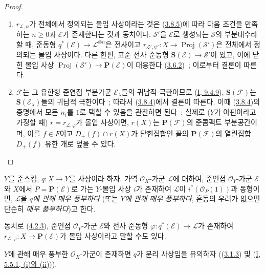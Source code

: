 \begin{proof}
\begin{enumerate}
  \item[\rm{(i)}] $r_{\mathcal{L},\psi}$가 전체에서 정의되는 몰입
  사상이라는 것은
  (\hyperref[II.3.8.5-ko]{3.8.5})에 따라 다음 조건을 만족하는
  $n\geq0$과 $\mathcal{E}$가 존재한다는 것과 동치이다.
  $\mathcal{S}'$을 $\mathcal{E}$로 생성되는 $\mathcal{S}$의
  부분대수라 할 때, 준동형
  $q^*(\mathcal{E})\to\mathcal{L}^{\otimes n}$은 전사이고
  $r_{\mathcal{L}',\psi'}:X\to\operatorname{Proj}(\mathcal{S}')$은
  전체에서 정의되는 몰입 사상이다. 다른 한편, 표준 전사 준동형
  $\mathbf{S}(\mathcal{E})\to\mathcal{S}'$이 있고, 이에 닫힌 몰입 사상
  $\operatorname{Proj}(\mathcal{S}')\to\mathbf{P}(\mathcal{E})$이
  대응한다 (\hyperref[II.3.6.2-ko]{3.6.2})~; 이로부터 결론이 따른다.
  \item[\rm{(ii)}] $\mathcal{F}$는 그 유한형 준연접 부분가군
  $\mathcal{E}_\lambda$들의 귀납적 극한이므로
  (\hyperref[I.9.4.9-ko]{I, 9.4.9}), $\mathbf{S}(\mathcal{F})$는
  $\mathbf{S}(\mathcal{E}_\lambda)$들의 귀납적 극한이다~; 따라서
  (\hyperref[II.3.8.4-ko]{3.8.4})에서 결론이 따른다. 이때
  (\hyperref[II.3.8.4-ko]{3.8.4})의 증명에서 모든 $n_i$를 $1$로
  택할 수 있음을 관찰하면 된다~: 실제로 ($Y$가 아핀이라고 가정할 때)
  $r=r_{\mathcal{L},\varphi}$가 몰입 사상이면, $r(X)$는
  $\mathbf{P}(\mathcal{F})$의 준콤팩트 부분공간이며, 이를
  $f\in F$이고 $D_+(f)\cap r(X)$가 닫힌집합인 꼴의
  $\mathbf{P}(\mathcal{F})$의 열린집합 $D_+(f)$ 유한 개로 덮을 수 있다.
\end{enumerate}
\end{proof}

\begin{definition}[4.4.2]
\label{II.4.4.2-ko}
$Y$를 준스킴, $q:X\to Y$를 사상이라 하자. 가역
$\mathcal{O}_X$-가군 $\mathcal{L}$에 대하여, 준연접
$\mathcal{O}_Y$-가군 $\mathcal{E}$와 $X$에서
$P=\mathbf{P}(\mathcal{E})$로 가는 $Y$-몰입 사상 $i$가 존재하여
$\mathcal{L}$이 $i^*(\mathcal{O}_P(1))$과 동형이면,
$\mathcal{L}$을 \emph{$q$에 관해 매우 풍부하다} (또는
\emph{$Y$에 관해 매우 풍부하다}, 혼동의 우려가 없으면 단순히
\emph{매우 풍부하다})고 한다.
\end{definition}

동치로 (\hyperref[II.4.2.3-ko]{4.2.3}), 준연접
$\mathcal{O}_Y$-가군 $\mathcal{E}$와 전사 준동형
$\varphi:q^*(\mathcal{E})\to\mathcal{L}$가 존재하여
$r_{\mathcal{L},\varphi}:X\to\mathbf{P}(\mathcal{E})$가 몰입
사상이라고 말할 수도 있다.

$Y$에 관해 매우 풍부한 $\mathcal{O}_X$-가군이 존재하면 $q$가
분리 사상임을 유의하자
((\hyperref[II.3.1.3-ko]{3.1.3}) 및
(\hyperref[I.5.5.1-ko]{I, 5.5.1, (i)와 (ii)})).

